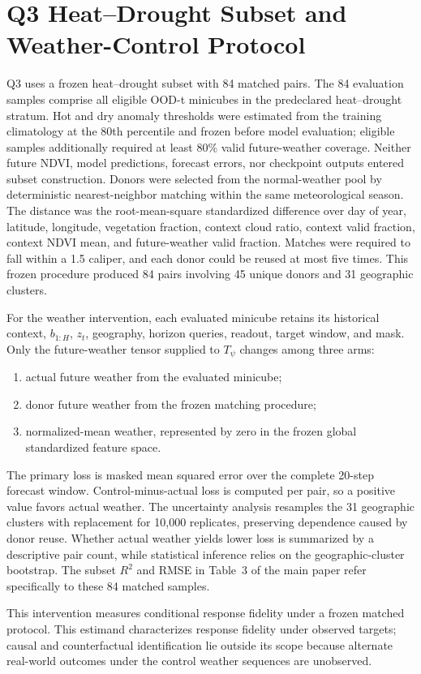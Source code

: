 \documentclass[letterpaper]{article}
\begin{document}
\section{Q3 Heat--Drought Subset and Weather-Control Protocol}
\label{sec:q3-results}

Q3 uses a frozen heat--drought subset with 84 matched pairs. The 84 evaluation
samples comprise all eligible OOD-t minicubes in the predeclared
heat--drought stratum. Hot and dry anomaly thresholds were estimated from the
training climatology at the 80th percentile and frozen before model
evaluation; eligible samples additionally required at least 80\% valid
future-weather coverage. Neither future NDVI, model predictions, forecast
errors, nor checkpoint outputs entered subset construction. Donors were
selected from the normal-weather pool by deterministic nearest-neighbor
matching within the same meteorological season. The distance was the
root-mean-square standardized difference over day of year, latitude,
longitude, vegetation fraction, context cloud ratio, context valid fraction,
context NDVI mean, and future-weather valid fraction. Matches were required
to fall within a 1.5 caliper, and each donor could be reused at most five
times. This frozen procedure produced 84 pairs involving 45 unique donors and
31 geographic clusters.

For the weather intervention, each evaluated minicube retains its historical
context, \(b_{1:H}\), \(z_t\), geography, horizon queries, readout, target
window, and mask. Only the future-weather tensor supplied to \(T_\psi\)
changes among three arms:
\begin{enumerate}
    \item actual future weather from the evaluated minicube;
    \item donor future weather from the frozen matching procedure;
    \item normalized-mean weather, represented by zero in the frozen
    global standardized feature space.
\end{enumerate}

The primary loss is masked mean squared error over the complete 20-step
forecast window. Control-minus-actual loss is computed per pair, so a positive
value favors actual weather. The uncertainty analysis resamples the 31
geographic clusters with replacement for 10,000 replicates, preserving
dependence caused by donor reuse. Whether actual weather yields lower loss is
summarized by a descriptive pair count, while statistical inference relies on
the geographic-cluster bootstrap. The subset \(R^2\) and RMSE in Table~3 of
the main paper refer specifically to these 84 matched samples.

This intervention measures conditional response fidelity under a frozen
matched protocol. This estimand characterizes response fidelity under observed
targets; causal and counterfactual identification lie outside its scope
because alternate real-world outcomes under the control weather sequences are
unobserved.
\end{document}
